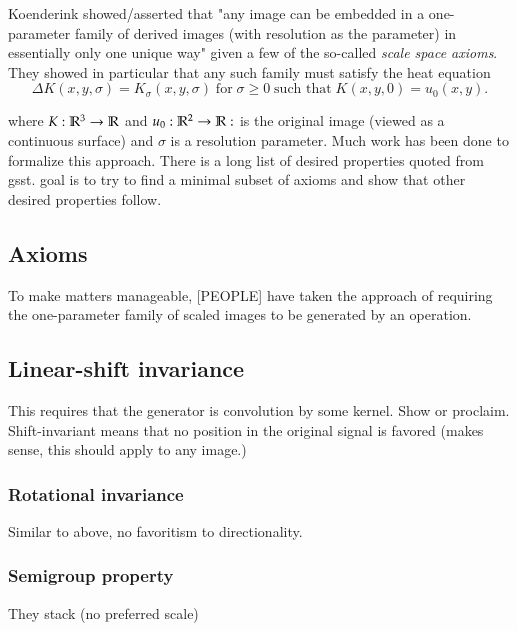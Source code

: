	Koenderink showed/asserted that "any image can be embedded in a one-parameter family of derived images (with resolution as the parameter) in essentially only one unique way" given a few of the so-called \textit{scale space axioms}. They showed in particular that any such family must satisfy the heat equation
	\begin{equation}
		\Delta K(x,y,\sigma) = K_\sigma (x,y,\sigma) 
		\;\text{for}\; \sigma \ge 0
		\;\text{such that}\; K(x,y, 0) = u_0(x,y).
		\end{equation}
		
		where $K: \mathbb{R}^3 \to \mathbb{R} $ and  $u_0: \mathbb{R}^2 \to \mathbb{R}: $ is the original image (viewed as a continuous surface) and $\sigma$ is a resolution parameter.
	Much work has been done to formalize this approach. There is a long list of desired properties
	quoted from gsst. goal is to try to find a minimal subset of axioms and show that other desired properties follow.
	
	
\subsection{Axioms}
	To make matters manageable, [PEOPLE] have taken the approach of requiring the one-parameter family of scaled images to be generated by an operation.
	
	\subsection{Linear-shift invariance}
		This requires that the generator is convolution by some kernel. Show or proclaim.
		Shift-invariant means that no position in the original signal is favored (makes sense, this should apply to any image.)
	
	\subsubsection{Rotational invariance}
		Similar to above, no favoritism to directionality.
	
	\subsubsection{Semigroup property}
		They stack (no preferred scale)
	
